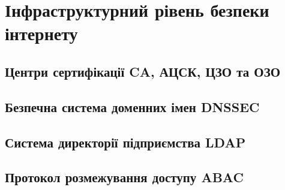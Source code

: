 \chapter{Інфраструктурний рівень безпеки інтернету}

\section{Центри сертифікації CA, АЦСК, ЦЗО та ОЗО}

\section{Безпечна система доменних імен DNSSEC}

\section{Система директорії підприємства LDAP}

\section{Протокол розмежування доступу ABAC}

